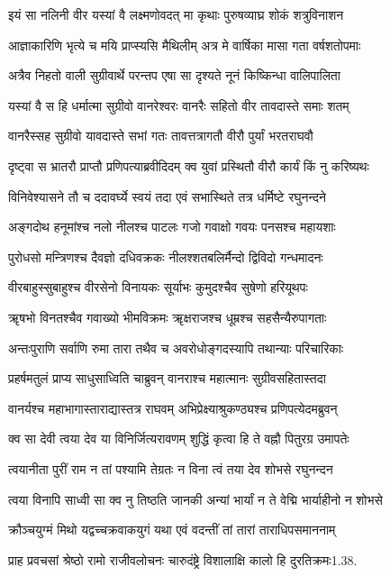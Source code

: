 \twolineshloka
{इयं सा नलिनी वीर यस्यां वै लक्ष्मणोवदत्}
{मा कृथाः पुरुषव्याघ्र शोकं शत्रुविनाशन}%

\twolineshloka
{आज्ञाकारिणि भृत्ये च मयि प्राप्स्यसि मैथिलीम्}
{अत्र मे वार्षिका मासा गता वर्षशतोपमाः}%

\twolineshloka
{अत्रैव निहतो वाली सुग्रीवार्थे परन्तप}
{एषा सा दृश्यते नूनं किष्किन्धा वालिपालिता}%

\twolineshloka
{यस्यां वै स हि धर्मात्मा सुग्रीवो वानरेश्वरः}
{वानरैः सहितो वीर तावदास्ते समाः शतम्}%

\twolineshloka
{वानरैस्सह सुग्रीवो यावदास्ते सभां गतः}
{तावत्तत्रागतौ वीरौ पुर्यां भरतराघवौ}%

\twolineshloka
{दृष्ट्वा स भ्रातरौ प्राप्तौ प्रणिपत्याब्रवीदिदम्}
{क्व युवां प्रस्थितौ वीरौ कार्यं किं नु करिष्यथः}%

\twolineshloka
{विनिवेश्यासने तौ च ददावर्घ्ये स्वयं तदा}
{एवं सभास्थिते तत्र धर्मिष्टे रघुनन्दने}%

\twolineshloka
{अङ्गदोथ हनूमांश्च नलो नीलश्च पाटलः}
{गजो गवाक्षो गवयः पनसश्च महायशाः}%

\twolineshloka
{पुरोधसो मन्त्रिणश्च दैवज्ञो दधिवक्रकः}
{नीलश्शतबलिर्मैन्दो द्विविदो गन्धमादनः}%

\twolineshloka
{वीरबाहुस्सुबाहुश्च वीरसेनो विनायकः}
{सूर्याभः कुमुदश्चैव सुषेणो हरियूथपः}%

\twolineshloka
{ॠषभो विनतश्चैव गवाख्यो भीमविक्रमः}
{ॠक्षराजश्च धूम्रश्च सहसैन्यैरुपागताः}%

\twolineshloka
{अन्तःपुराणि सर्वाणि रुमा तारा तथैव च}
{अवरोधोङ्गदस्यापि तथान्याः परिचारिकाः}%

\twolineshloka
{प्रहर्षमतुलं प्राप्य साधुसाध्विति चाब्रुवन्}
{वानराश्च महात्मानः सुग्रीवसहितास्तदा}%

\twolineshloka
{वानर्यश्च महाभागास्ताराद्यास्तत्र राघवम्}
{अभिप्रेक्ष्याश्रुकण्ठ्यश्च प्रणिपत्येदमब्रुवन्}%

\twolineshloka
{क्व सा देवी त्वया देव या विनिर्जित्यरावणम्}
{शुद्धिं कृत्वा हि ते वह्नौ पितुरग्र उमापतेः}%

\twolineshloka
{त्वयानीता पुरीं राम न तां पश्यामि तेग्रतः}
{न विना त्वं तया देव शोभसे रघुनन्दन}%

\twolineshloka
{त्वया विनापि साध्वी सा क्व नु तिष्ठति जानकी}
{अन्यां भार्यां न ते वेद्मि भार्याहीनो न शोभसे}%

\twolineshloka
{क्रौञ्चयुग्मं मिथो यद्वच्चक्रवाकयुगं यथा}
{एवं वदन्तीं तां तारां ताराधिपसमाननाम्}%

\twolineshloka
{प्राह प्रवचसां श्रेष्ठो रामो राजीवलोचनः}
{चारुदंष्ट्रे विशालाक्षि कालो हि दुरतिक्रमः1.38.}%

